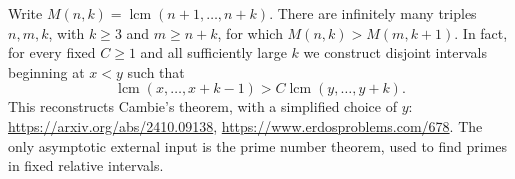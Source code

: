 Write \(M(n,k)=\operatorname{lcm}(n+1,\ldots,n+k)\).
There are infinitely many triples \(n,m,k\), with \(k\geq3\) and
\(m\geq n+k\), for which \(M(n,k)>M(m,k+1)\).
In fact, for every fixed \(C\geq1\) and all sufficiently large \(k\)
we construct disjoint intervals beginning at \(x<y\) such that
\[
 \operatorname{lcm}(x,\ldots,x+k-1)>
 C\operatorname{lcm}(y,\ldots,y+k).
\]
This reconstructs Cambie's theorem, with a simplified choice of \(y\):
\url{https://arxiv.org/abs/2410.09138},
\url{https://www.erdosproblems.com/678}.
The only asymptotic external input is the prime number theorem, used
to find primes in fixed relative intervals.
